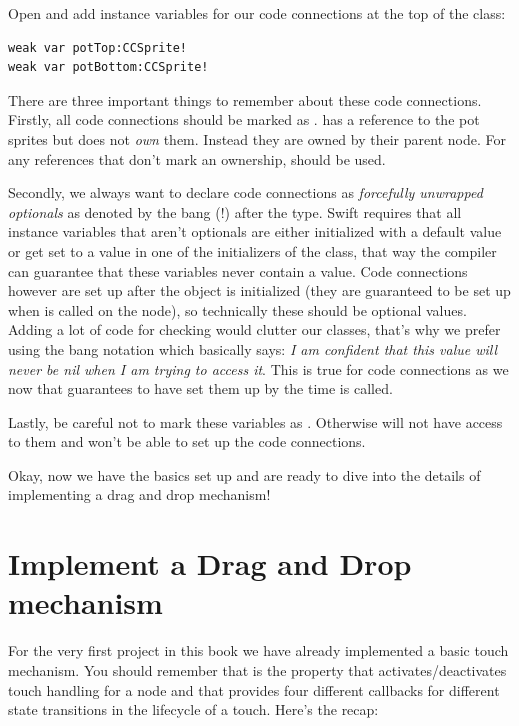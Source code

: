 \begin{leftbar}
Open  and add instance variables for our code
connections at the top of the class:
\begin{lstlisting}
weak var potTop:CCSprite!
weak var potBottom:CCSprite!
\end{lstlisting}
\end{leftbar}
There are three important things to remember about these code connections.
Firstly, all code connections should be marked as .
 has a reference to the pot sprites but does not
\textit{own} them. Instead they are owned by their parent node. For any
references that don't mark an ownership,  should be used. 

Secondly, we always want to declare code connections as \textit{forcefully
unwrapped optionals} as denoted by the bang (!) after the type. Swift
requires that all instance variables that aren't optionals are either
initialized with a default value or get set to a value in one of the
initializers of the class, that way the compiler can guarantee that these
variables never contain a  value. Code connections however are
set up after the object is initialized (they are guaranteed to be set up
when  is called on the node), so technically these
should be optional values. Adding a lot of code for  checking
would clutter our classes, that's why we prefer using the bang notation which
basically says: \textit{I am confident that this value will never be nil when I
am trying to access it}. This is true for code connections as we now that
\cocos{} guarantees to have set them up by the time 
is called.

Lastly, be careful not to mark these variables as .
Otherwise \cocos{} will not have access to them and won't be able to set up the
code connections.

Okay, now we have the basics set up and are ready to dive into the details of
implementing a drag and drop mechanism!

\section{Implement a Drag and Drop mechanism}
For the very first project in this book we have already implemented a basic
touch mechanism. You should remember that  is
the property that activates/deactivates touch handling for a node and that
\cocos{} provides four different callbacks for different state transitions in
the lifecycle of a touch. Here's the recap:

